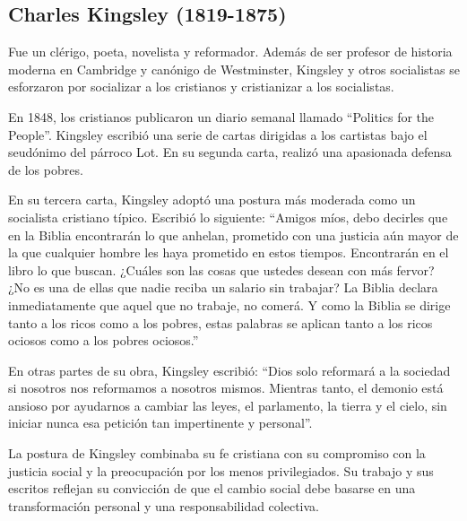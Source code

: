 \documentclass[
  letterpaper,
  DIV=11,
  numbers=noendperiod]{scrartcl}
\begin{document}
\hypertarget{charles-kingsley-1819-1875}{%
\subsection{Charles Kingsley
(1819-1875)}\label{charles-kingsley-1819-1875}}

Fue un clérigo, poeta, novelista y reformador. Además de ser profesor de
historia moderna en Cambridge y canónigo de Westminster, Kingsley y
otros socialistas se esforzaron por socializar a los cristianos y
cristianizar a los socialistas.

En 1848, los cristianos publicaron un diario semanal llamado ``Politics
for the People''. Kingsley escribió una serie de cartas dirigidas a los
cartistas bajo el seudónimo del párroco Lot. En su segunda carta,
realizó una apasionada defensa de los pobres.

En su tercera carta, Kingsley adoptó una postura más moderada como un
socialista cristiano típico. Escribió lo siguiente: ``Amigos míos, debo
decirles que en la Biblia encontrarán lo que anhelan, prometido con una
justicia aún mayor de la que cualquier hombre les haya prometido en
estos tiempos. Encontrarán en el libro lo que buscan. ¿Cuáles son las
cosas que ustedes desean con más fervor? ¿No es una de ellas que nadie
reciba un salario sin trabajar? La Biblia declara inmediatamente que
aquel que no trabaje, no comerá. Y como la Biblia se dirige tanto a los
ricos como a los pobres, estas palabras se aplican tanto a los ricos
ociosos como a los pobres ociosos.''

En otras partes de su obra, Kingsley escribió: ``Dios solo reformará a
la sociedad si nosotros nos reformamos a nosotros mismos. Mientras
tanto, el demonio está ansioso por ayudarnos a cambiar las leyes, el
parlamento, la tierra y el cielo, sin iniciar nunca esa petición tan
impertinente y personal''.

La postura de Kingsley combinaba su fe cristiana con su compromiso con
la justicia social y la preocupación por los menos privilegiados. Su
trabajo y sus escritos reflejan su convicción de que el cambio social
debe basarse en una transformación personal y una responsabilidad
colectiva.


\printbibliography
\end{document}

